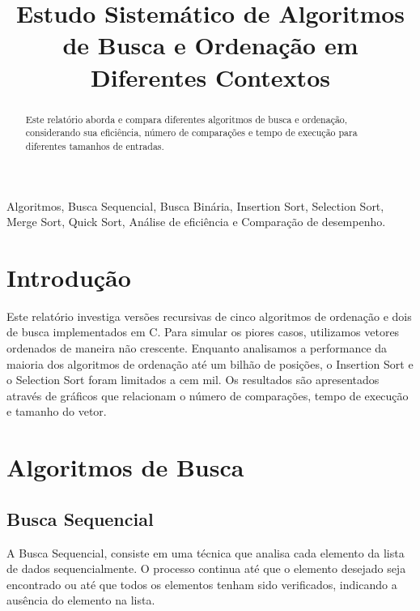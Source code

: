 \documentclass[conference]{IEEEtran}
\begin{document}
\title{Estudo Sistemático de Algoritmos de Busca e Ordenação em Diferentes Contextos}

\author{}

\maketitle

\begin{abstract}
Este relatório aborda e compara diferentes algoritmos de busca e ordenação, considerando sua eficiência, número de comparações e tempo de execução para diferentes tamanhos de entradas.
\end{abstract}

\begin{IEEEkeywords}
Algoritmos, Busca Sequencial, Busca Binária, Insertion Sort, Selection Sort, Merge Sort, Quick Sort, Análise de eficiência e Comparação de desempenho.
\end{IEEEkeywords}

\section{Introdução}
Este relatório investiga versões recursivas de cinco algoritmos de ordenação e dois de busca implementados em C. Para simular os piores casos, utilizamos vetores ordenados de maneira não crescente. Enquanto analisamos a performance da maioria dos algoritmos de ordenação até um bilhão de posições, o Insertion Sort e o Selection Sort foram limitados a cem mil. Os resultados são apresentados através de gráficos que relacionam o número de comparações, tempo de execução e tamanho do vetor.

\section{Algoritmos de Busca}
\subsection{Busca Sequencial}
A Busca Sequencial, consiste em uma técnica que analisa cada elemento da lista de dados sequencialmente. O processo continua até que o elemento desejado seja encontrado ou até que todos os elementos tenham sido verificados, indicando a ausência do elemento na lista.
\end{document}
